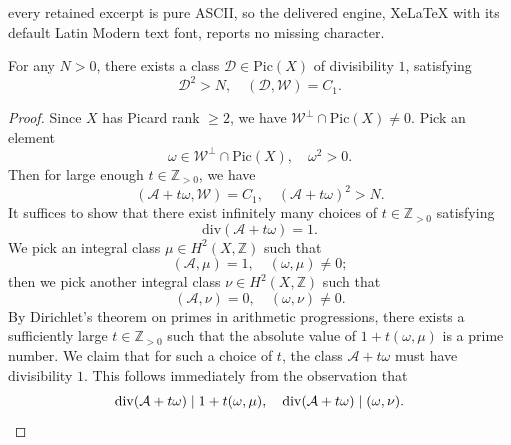 \documentclass[10pt,a4paper]{amsart}
\newcommand{\BZ}{{\mathbb{Z}}}
\newcommand{\CA}{{\mathcal A}}
\newcommand{\CD}{{\mathcal D}}
\newcommand{\CW}{{\mathcal W}}
\begin{document}
every retained excerpt is pure ASCII, so the delivered engine, XeLaTeX with its default Latin Modern text font, reports no missing character.
\begin{prop}\label{prop2.2}
For any $N>0$, there exists a class $\CD\in \mathrm{Pic}(X)$ of divisibility $1$, satisfying
\[
\CD^2>N, \quad (\CD,\CW) = C_1.
\]
\end{prop}

\begin{proof}
    Since $X$ has Picard rank $\geq 2$, we have $\CW^\perp \cap \mathrm{Pic}(X) \neq 0$. Pick an element 
    \[
    \omega \in \CW^\perp \cap \mathrm{Pic}(X), \quad \omega^2 >0.
    \]
    Then for large enough $t \in \BZ_{>0}$, we have
    \[
    (\CA + t\omega, \CW) = C_1, \quad (\CA + t\omega)^2 >N.
    \]
    It suffices to show that there exist infinitely many choices of $t\in \BZ_{>0}$ satisfying 
    \[
    \mathrm{div}(\CA + t\omega)=1.
    \]
    We pick an integral class $\mu \in H^2(X,\BZ)$ such that
    \[
    (\CA, \mu)=1, \quad (\omega, \mu) \neq 0;
    \]
    then we pick another integral class $\nu \in H^2(X, \BZ)$ such that
    \[(\CA, \nu) = 0, \quad (\omega, \nu) \neq 0.
    \]
    By Dirichlet's theorem on primes in arithmetic progressions, there exists a sufficiently large $t\in \BZ_{>0}$ such that the absolute value of $1 + t(\omega, \mu)$ is a prime number. We claim that for such a choice of $t$, the class $\CA + t\omega$ must have divisibility $1$. This follows immediately from the observation that 
    \[
    \mathrm{div}(\CA + t\omega) \mid 1 + t(\omega, \mu), \quad \mathrm{div}(\CA + t\omega) \mid (\omega, \nu). \qedhere
    \]
\end{proof}
\end{document}
